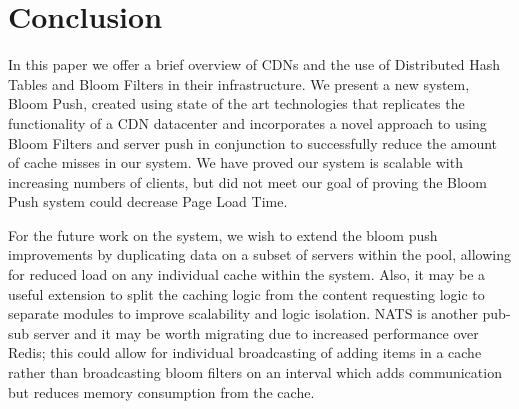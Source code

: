 \documentclass[conference]{IEEEtran}
\begin{document}
\section{Conclusion}\label{sec:conclusion}
In this paper we offer a brief overview of CDNs and the use of Distributed Hash Tables and Bloom Filters in their infrastructure. We present a new system, Bloom Push, created using state of the art technologies that replicates the functionality of a CDN datacenter and incorporates a novel approach to using Bloom Filters and server push in conjunction to successfully reduce the amount of cache misses in our system. We have proved our system is scalable with increasing numbers of clients, but did not meet our goal of proving the Bloom Push system could decrease Page Load Time. 

For the future work on the system, we wish to extend the bloom push improvements by duplicating data on a subset of servers within the pool, allowing for reduced load on any individual cache within the system.  Also, it may be a useful extension to split the caching logic from the content requesting logic to separate modules to improve scalability and logic isolation.  NATS is another pub-sub server and it may be worth migrating due to increased performance over Redis; this could allow for individual broadcasting of adding items in a cache rather than broadcasting bloom filters on an interval which adds communication but reduces memory consumption from the cache.



\end{document}
